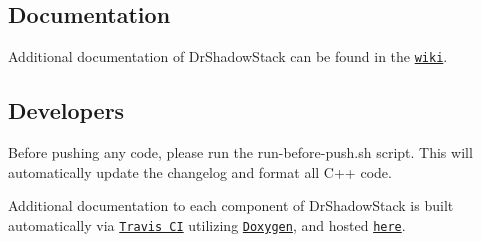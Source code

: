 \subsection*{Documentation}

Additional documentation of Dr\-Shadow\-Stack can be found in the \href{https://github.com/zwimer/DrShadowStack/wiki}{\tt wiki}.

\subsection*{Developers}

Before pushing any code, please run the {\ttfamily run-\/before-\/push.\-sh} script. This will automatically update the changelog and format all {\ttfamily C++} code.

Additional documentation to each component of Dr\-Shadow\-Stack is built automatically via \href{https://travis-ci.org/}{\tt Travis C\-I} utilizing \href{http://www.stack.nl/~dimitri/doxygen/}{\tt Doxygen}, and hosted \href{https://zwimer.com/DrShadowStack}{\tt here}. 